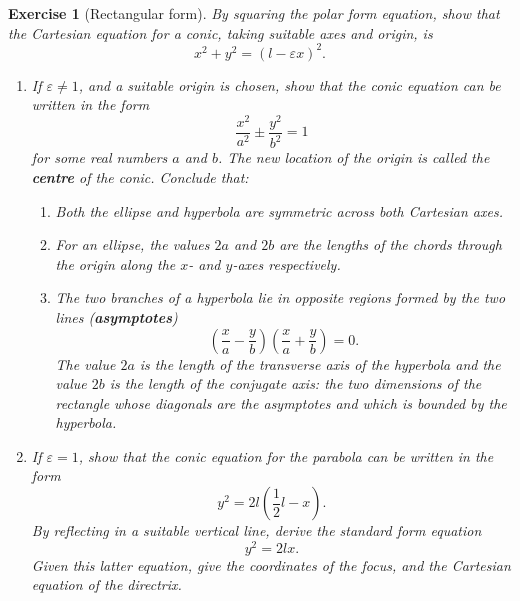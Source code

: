 \documentclass[a4paper,leqno,9pt]{article}
\theoremstyle{exercise}
\newtheorem{exercise}{Exercise}
\theoremstyle{plain}
\theoremstyle{definition}
\theoremstyle{remark}
\newcommand{\df}[1]{\textbf{#1}}
\begin{document}
\begin{exercise}[Rectangular form]
  By squaring the polar form equation, show that the Cartesian equation for a conic, taking suitable axes and origin, is
  \begin{displaymath}
    x^2 + y^2 = (l - \varepsilon x)^2.
  \end{displaymath}
  \begin{enumerate}
    \item If $ \varepsilon \neq 1 $, and a suitable origin is chosen, show that the conic equation can be written in the form
          \begin{displaymath}
            \frac{x^2}{a^2} \pm \frac{y^2}{b^2} = 1
          \end{displaymath}
          for some real numbers $ a $ and $ b $. The new location of the origin is called the \df{centre} of the conic. Conclude that:
          \begin{enumerate}
            \item Both the ellipse and hyperbola are symmetric across both Cartesian axes.
            \item For an ellipse, the values $ 2a $ and $ 2b $ are the lengths of the chords through the origin along the $ x$- and $ y$-axes respectively.
            \item The two branches of a hyperbola lie in opposite regions formed by the two lines (\df{asymptotes})
                    \begin{displaymath}
                      \left(\frac{x}{a} - \frac{y}{b} \right)\left(\frac{x}{a} + \frac{y}{b} \right) = 0.
                    \end{displaymath}
                    The value $ 2a $ is the length of the transverse axis of the hyperbola and the value $ 2b $ is the length of the conjugate
                    axis: the two dimensions of the rectangle whose diagonals are the asymptotes and which is bounded by the hyperbola.
          \end{enumerate}
    \item If $ \varepsilon = 1 $, show that the conic equation for the parabola can be written in the form
          \begin{displaymath}
            y^2 = 2l(\frac{1}{2}l - x).
          \end{displaymath}
          By reflecting in a suitable vertical line, derive the standard form equation
          \begin{displaymath}
            y^2 = 2lx.
          \end{displaymath}
          Given this latter equation, give the coordinates of the focus, and the Cartesian equation of the directrix.
  \end{enumerate}
\end{exercise}
\end{document}

